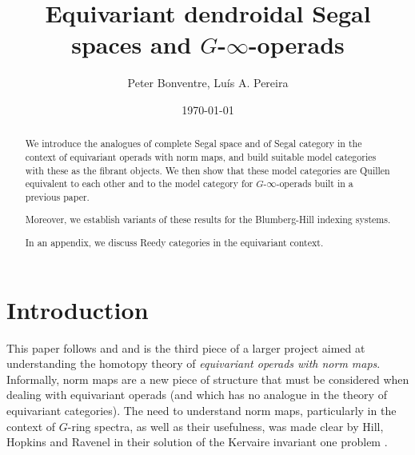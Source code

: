 \documentclass[a4paper,10pt
,draft
]{article}%
\author{Peter Bonventre, Lu\'is A. Pereira}%
\title{Equivariant dendroidal Segal spaces and $G$-$\infty$-operads}%
\date{\today}
\begin{document}
	\maketitle%



\begin{abstract}
	We introduce the analogues of complete Segal space and of Segal category in the context of equivariant operads with norm maps, and build suitable model categories with these as the fibrant objects. We then show that these model categories are Quillen equivalent to each other and to the model category for 
	$G$-$\infty$-operads built in a previous paper.

	Moreover, we establish variants of these results for the Blumberg-Hill indexing systems. 
      
	In an appendix, we discuss Reedy categories in the equivariant context.
\end{abstract}



\tableofcontents


%
 


\section{Introduction}

This paper follows \cite{Per17} and \cite{BP17} and is the third piece of a larger project aimed at understanding the homotopy theory of 
\textit{equivariant operads with norm maps}.
Informally, norm maps are a new piece of structure that must be considered when dealing with equivariant operads
(and which has no analogue in the theory of equivariant categories).
The need to understand norm maps, particularly in the context of $G$-ring spectra,
as well as their usefulness,
was made clear by Hill, Hopkins and Ravenel in their solution of the Kervaire invariant one problem \cite{HHR16}.
\end{document}
